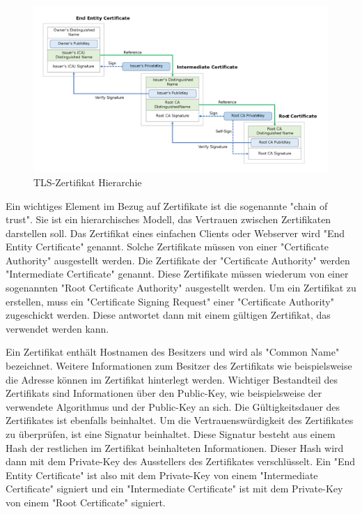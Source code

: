 \begin{figure}[H]
    \centering
    \includegraphics{media/OpenSSL/cert.png}
    \caption{TLS-Zertifikat Hierarchie \cite{ChainOfTrust}}
\end{figure}

Ein wichtiges Element im Bezug auf Zertifikate ist die sogenannte "chain of trust". Sie ist ein hierarchisches Modell, das Vertrauen zwischen Zertifikaten darstellen soll. Das Zertifikat eines einfachen Clients oder Webserver wird "End Entity Certificate" genannt. Solche Zertifikate müssen von einer "Certificate Authority" ausgestellt werden. Die Zertifikate der "Certificate Authority" werden "Intermediate Certificate" genannt. Diese Zertifikate müssen wiederum von einer sogenannten "Root Certificate Authority" ausgestellt werden. Um ein Zertifikat zu erstellen, muss ein "Certificate Signing Request" einer "Certificate Authority" zugeschickt werden. Diese antwortet dann mit einem gültigen Zertifikat, das verwendet werden kann.

Ein Zertifikat enthält Hostnamen des Besitzers und wird als "Common Name" bezeichnet. Weitere Informationen zum Besitzer des Zertifikats wie beispielsweise die Adresse können im Zertifikat hinterlegt werden. Wichtiger Bestandteil des Zertifikats sind Informationen über den Public-Key, wie beispielsweise der verwendete Algorithmus und der Public-Key an sich. Die Gültigkeitsdauer des Zertifikates ist ebenfalls beinhaltet. Um die Vertrauenswürdigkeit des Zertifikates zu überprüfen, ist eine Signatur beinhaltet. Diese Signatur besteht aus einem Hash der restlichen im Zertifikat beinhalteten Informationen. Dieser Hash wird dann mit dem Private-Key des Ausstellers des Zertifikates verschlüsselt. Ein "End Entity Certificate" ist also mit dem Private-Key von einem "Intermediate Certificate" signiert und ein "Intermediate Certificate" ist mit dem Private-Key von einem "Root Certificate" signiert. \cite{ChainOfTrust}

